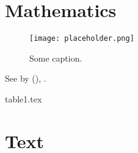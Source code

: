 
\section{Mathematics}
    \blindrandomtrue
    \blindmathtrue
    \blindmathpaper
    \begin{figure}[htp]
        \centering
        \texttt{[image: placeholder.png]}
        \caption{Some caption.}
    \end{figure}

    See  by \citeauthor{Black1976} (\citeyear{Black1976}), \cite{Black1976}.

    {table1.tex}

\section{Text}
    \Blinddescription